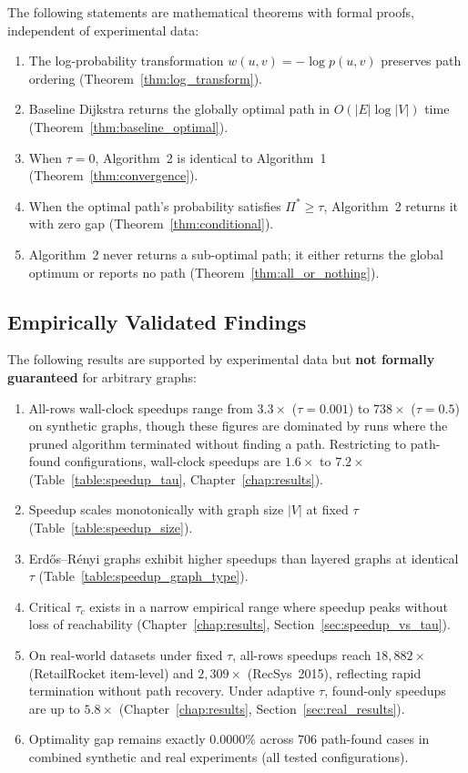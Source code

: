 The following statements are mathematical theorems with formal proofs, independent of experimental data:

\begin{enumerate}
\item[(T1)] The log-probability transformation $w(u,v) = -\log p(u,v)$ preserves path ordering (Theorem~\ref{thm:log_transform}).
\item[(T2)] Baseline Dijkstra returns the globally optimal path in $O(|E|\log|V|)$ time (Theorem~\ref{thm:baseline_optimal}).
\item[(T3)] When $\tau = 0$, Algorithm~2 is identical to Algorithm~1 (Theorem~\ref{thm:convergence}).
\item[(T4)] When the optimal path's probability satisfies $\Pi^* \geq \tau$, Algorithm~2 returns it with zero gap (Theorem~\ref{thm:conditional}).
\item[(T5)] Algorithm~2 never returns a sub-optimal path; it either returns the global optimum or reports no path (Theorem~\ref{thm:all_or_nothing}).
\end{enumerate}

\subsection{Empirically Validated Findings}

The following results are supported by experimental data but \textbf{not formally guaranteed} for arbitrary graphs:

\begin{enumerate}
\item[(E1)] All-rows wall-clock speedups range from $3.3\times$ ($\tau=0.001$) to $738\times$ ($\tau=0.5$) on synthetic graphs, though these figures are dominated by runs where the pruned algorithm terminated without finding a path. Restricting to path-found configurations, wall-clock speedups are $1.6\times$ to $7.2\times$ (Table~\ref{table:speedup_tau}, Chapter~\ref{chap:results}).
\item[(E2)] Speedup scales monotonically with graph size $|V|$ at fixed $\tau$ (Table~\ref{table:speedup_size}).
\item[(E3)] Erd\H{o}s--R\'{e}nyi graphs exhibit higher speedups than layered graphs at identical $\tau$ (Table~\ref{table:speedup_graph_type}).
\item[(E4)] Critical $\tau_c$ exists in a narrow empirical range where speedup peaks without loss of reachability (Chapter~\ref{chap:results}, Section~\ref{sec:speedup_vs_tau}).
\item[(E5)] On real-world datasets under fixed $\tau$, all-rows speedups reach $18{,}882\times$ (RetailRocket item-level) and $2{,}309\times$ (RecSys~2015), reflecting rapid termination without path recovery. Under adaptive $\tau$, found-only speedups are up to $5.8\times$ (Chapter~\ref{chap:results}, Section~\ref{sec:real_results}).
\item[(E6)] Optimality gap remains exactly $0.0000\%$ across 706 path-found cases in combined synthetic and real experiments (all tested configurations).
\end{enumerate}

